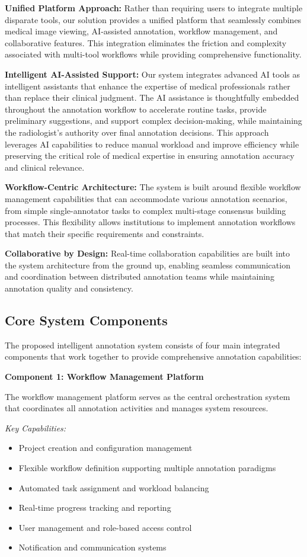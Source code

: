 \textbf{Unified Platform Approach:} Rather than requiring users to integrate multiple disparate tools, our solution provides a unified platform that seamlessly combines medical image viewing, AI-assisted annotation, workflow management, and collaborative features. This integration eliminates the friction and complexity associated with multi-tool workflows while providing comprehensive functionality.

\textbf{Intelligent AI-Assisted Support:} Our system integrates advanced AI tools as intelligent assistants that enhance the expertise of medical professionals rather than replace their clinical judgment. The AI assistance is thoughtfully embedded throughout the annotation workflow to accelerate routine tasks, provide preliminary suggestions, and support complex decision-making, while maintaining the radiologist's authority over final annotation decisions. This approach leverages AI capabilities to reduce manual workload and improve efficiency while preserving the critical role of medical expertise in ensuring annotation accuracy and clinical relevance.

\textbf{Workflow-Centric Architecture:} The system is built around flexible workflow management capabilities that can accommodate various annotation scenarios, from simple single-annotator tasks to complex multi-stage consensus building processes. This flexibility allows institutions to implement annotation workflows that match their specific requirements and constraints.

\textbf{Collaborative by Design:} Real-time collaboration capabilities are built into the system architecture from the ground up, enabling seamless communication and coordination between distributed annotation teams while maintaining annotation quality and consistency.

\subsection{Core System Components}

The proposed intelligent annotation system consists of four main integrated components that work together to provide comprehensive annotation capabilities:

\textbf{Component 1: Workflow Management Platform}

The workflow management platform serves as the central orchestration system that coordinates all annotation activities and manages system resources.

\textit{Key Capabilities:}
\begin{itemize}
    \item Project creation and configuration management
    \item Flexible workflow definition supporting multiple annotation paradigms
    \item Automated task assignment and workload balancing
    \item Real-time progress tracking and reporting
    \item User management and role-based access control
    \item Notification and communication systems
\end{itemize}

